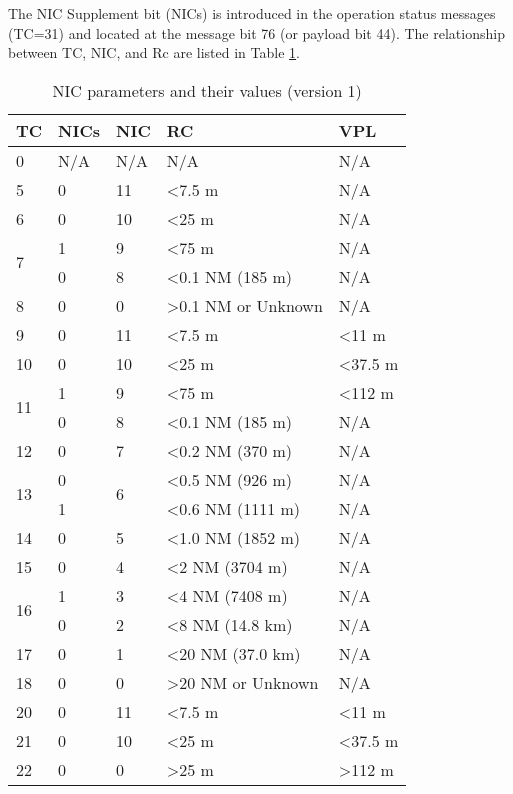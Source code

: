 The NIC Supplement bit (NICs) is introduced in the operation status messages (TC=31) and located at the message bit 76 (or payload bit 44). The relationship between TC, NIC, and Rc are listed in Table \ref{tb:nic-params-v1}.

\begin{table}[!ht]
\caption{NIC parameters and their values (version 1)}
\label{tb:nic-params-v1}
\begin{tabular}{|l|l|l|l|l|}
\hline
\textbf{TC} & \textbf{NICs} & \textbf{NIC} & \textbf{RC} & \textbf{VPL} \\ \hline \hline
0 & N/A & N/A & N/A & N/A \\ \hline
5 & 0 & 11 & \textless 7.5 m & N/A \\ \hline
6 & 0 & 10 & \textless 25 m & N/A \\ \hline
\multirow{2}{*}{7} & 1 & 9 & \textless 75 m & N/A \\ \cline{2-5}
 & 0 & 8 & \textless 0.1 NM (185 m) & N/A \\ \hline
8 & 0 & 0 & \textgreater 0.1 NM or Unknown & N/A \\ \hline
\hline
9 & 0 & 11 & \textless 7.5 m & \textless 11 m \\ \hline
10 & 0 & 10 & \textless 25 m & \textless 37.5 m \\ \hline
\multirow{2}{*}{11} & 1 & 9 & \textless 75 m & \textless 112 m \\ \cline{2-5}
 & 0 & 8 & \textless 0.1 NM (185 m) & N/A \\ \hline
12 & 0 & 7 & \textless 0.2 NM (370 m) & N/A \\ \hline
\multirow{2}{*}{13} & 0 & \multirow{2}{*}{6} & \textless 0.5 NM (926 m) & N/A \\ \cline{2-2} \cline{4-5}
 & 1 &  & \textless 0.6 NM (1111 m) & N/A \\ \hline
14 & 0 & 5 & \textless 1.0 NM (1852 m) & N/A \\ \hline
15 & 0 & 4 & \textless 2 NM (3704 m) & N/A \\ \hline
\multirow{2}{*}{16} & 1 & 3 & \textless 4 NM (7408 m) & N/A \\ \cline{2-5}
 & 0 & 2 & \textless 8 NM (14.8 km) & N/A \\ \hline
17 & 0 & 1 & \textless 20 NM (37.0 km) & N/A \\ \hline
18 & 0 & 0 & \textgreater 20 NM or Unknown & N/A \\ \hline
\hline
20 & 0 & 11 & \textless 7.5 m & \textless 11 m \\ \hline
21 & 0 & 10 & \textless 25 m & \textless 37.5 m \\ \hline
22 & 0 & 0 & \textgreater 25 m & \textgreater 112 m \\ \hline
\end{tabular}
\end{table}

